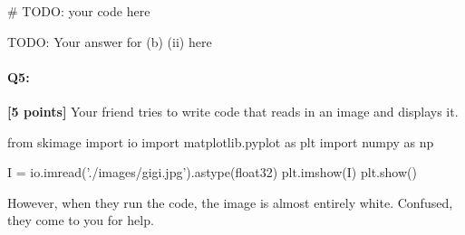 \documentclass[11pt]{article}
\begin{document}
\begin{enumerate}[(a)]
\begin{enumerate}[(i)]
\begin{tcolorbox}[colback=white!5!white,colframe=green!75!black,height=10cm]
    \begin{python}
    # TODO: your code here
    \end{python}

    TODO: Your answer for (b) (ii) here 
    
    
\end{tcolorbox}

\end{enumerate}
\end{enumerate}


\pagebreak
    \paragraph{Q5:} \textbf{[5 points]} Your friend tries to write code that reads in an image and displays it. 
    
    \begin{python}
        from skimage import io
        import matplotlib.pyplot as plt
        import numpy as np

        I = io.imread('./images/gigi.jpg').astype(float32)
        plt.imshow(I)
        plt.show()
    \end{python}
    
    However, when they run the code, the image is almost entirely white. Confused, they come to you for help.
\end{document}
